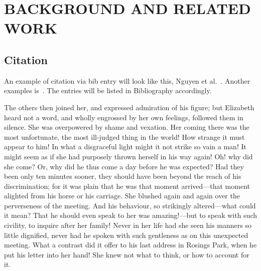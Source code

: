 \chapter{BACKGROUND AND RELATED WORK}
\label{ch:background}

\section{Citation}

An example of citation via bib entry will look like this, Nguyen et al.~\cite{munzner2014visualization}. Another examples is~\cite{Nguyen2022MalView}. The entries will be listed in Bibliography accordingly.

The others then joined her, and expressed admiration of his figure; but Elizabeth heard not a word, and wholly engrossed by her own feelings, followed them in silence. She was overpowered by shame and vexation. Her coming there was the most unfortunate, the most ill-judged thing in the world! How strange it must appear to him! In what a disgraceful light might it not strike so vain a man! It might seem as if she had purposely thrown herself in his way again! Oh! why did she come? Or, why did he thus come a day before he was expected? Had they been only ten minutes sooner, they should have been beyond the reach of his discrimination; for it was plain that he was that moment arrived—that moment alighted from his horse or his carriage. She blushed again and again over the perverseness of the meeting. And his behaviour, so strikingly altered—what could it mean? That he should even speak to her was amazing!—but to speak with such civility, to inquire after her family! Never in her life had she seen his manners so little dignified, never had he spoken with such gentleness as on this unexpected meeting. What a contrast did it offer to his last address in Rosings Park, when he put his letter into her hand! She knew not what to think, or how to account for it.
